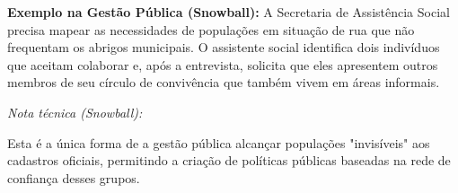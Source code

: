 \textbf{Exemplo na Gestão Pública (Snowball):}  \vskip0.3cm
A Secretaria de Assistência Social precisa mapear as necessidades de populações em situação de rua que não frequentam os abrigos municipais. O assistente social identifica dois indivíduos que aceitam colaborar e, após a entrevista, solicita que eles apresentem outros membros de seu círculo de convivência que também vivem em áreas informais. \vskip0.3cm


\textit{Nota técnica (Snowball):}  \vskip0.3cm

Esta é a única forma de a gestão pública alcançar populações "invisíveis" aos cadastros oficiais, permitindo a criação de políticas públicas baseadas na rede de confiança desses grupos.

